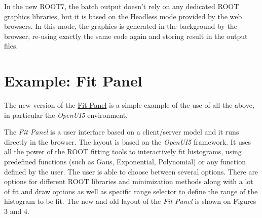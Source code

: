 \documentclass[a4paper]{jpconf}
\begin{document}
In the new ROOT7, the batch output doesn't rely on any dedicated ROOT graphics
libraries, but it is based on the \textit{}{Headless mode} provided by the web
browsers. In this mode, the graphics is generated in the background by the browser, re-using exactly the same code again and storing result in the output files.

\section{Example: Fit Panel}

The new version of the \href{https://root.cern.ch/fit-panel}{Fit Panel} is a simple
example of the use of all the above, in particular the \textit{OpenUI5} environment.

The \textit{Fit Panel} is a user interface based on a client/server model and it runs directly
in the browser. The layout is based on the \textit{OpenUI5} framework. It uses all the
power of the ROOT fitting tools to interactively fit histograms, using predefined
functions (such as Gaus, Exponential, Polynomial) or any function defined by
the user. The user is able to choose between several options. There are options
for different ROOT libraries and minimization methods along with a lot of fit
and draw options as well as specific range selector to define the range of the
histogram to be fit. The new and old layout of the \textit{Fit Panel} is shown on Figures 3 and 4.
\end{document}
